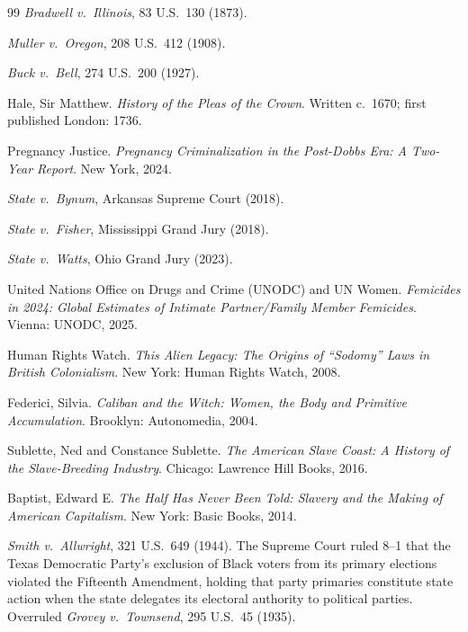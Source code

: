 \documentclass[12pt,openany]{book}
\begin{document}
\begin{thebibliography}{99}
\textit{Bradwell v.\ Illinois}, 83 U.S.\ 130 (1873).

\textit{Muller v.\ Oregon}, 208 U.S.\ 412 (1908).

\textit{Buck v.\ Bell}, 274 U.S.\ 200 (1927).

Hale, Sir Matthew. \textit{History of the Pleas of the Crown}. Written c.\ 1670; first published London: 1736.

Pregnancy Justice. \textit{Pregnancy Criminalization in the Post-Dobbs Era: A Two-Year Report}. New York, 2024.

\textit{State v.\ Bynum}, Arkansas Supreme Court (2018).

\textit{State v.\ Fisher}, Mississippi Grand Jury (2018).

\textit{State v.\ Watts}, Ohio Grand Jury (2023).


United Nations Office on Drugs and Crime (UNODC) and UN Women. \textit{Femicides in 2024: Global Estimates of Intimate Partner/Family Member Femicides}. Vienna: UNODC, 2025.

Human Rights Watch. \textit{This Alien Legacy: The Origins of ``Sodomy'' Laws in British Colonialism}. New York: Human Rights Watch, 2008.

Federici, Silvia. \textit{Caliban and the Witch: Women, the Body and Primitive Accumulation}. Brooklyn: Autonomedia, 2004.

Sublette, Ned and Constance Sublette. \textit{The American Slave Coast: A History of the Slave-Breeding Industry}. Chicago: Lawrence Hill Books, 2016.

Baptist, Edward E. \textit{The Half Has Never Been Told: Slavery and the Making of American Capitalism}. New York: Basic Books, 2014.


\textit{Smith v.\ Allwright}, 321 U.S.~649 (1944). The Supreme Court ruled 8--1 that the Texas Democratic Party's exclusion of Black voters from its primary elections violated the Fifteenth Amendment, holding that party primaries constitute state action when the state delegates its electoral authority to political parties. Overruled \textit{Grovey v.\ Townsend}, 295 U.S.~45 (1935).


\end{thebibliography}
\end{document}
